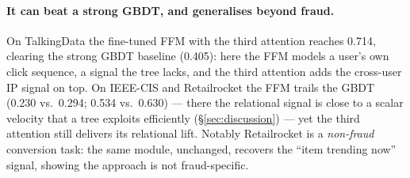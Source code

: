 \paragraph{It can beat a strong GBDT, and generalises beyond fraud.} On TalkingData the fine-tuned
FFM with the third attention reaches \num{0.714}, clearing the strong GBDT baseline (\num{0.405}):
here the FFM models a user's own click sequence, a signal the tree lacks, and the third attention
adds the cross-user IP signal on top. On IEEE-CIS and Retailrocket the FFM trails the GBDT
(\num{0.230} vs.\ \num{0.294}; \num{0.534} vs.\ \num{0.630}) --- there the relational signal is close
to a scalar velocity that a tree exploits efficiently (\S\ref{sec:discussion}) --- yet the third
attention still delivers its relational lift. Notably Retailrocket is a \emph{non-fraud} conversion
task: the same module, unchanged, recovers the ``item trending now'' signal, showing the approach is
not fraud-specific.
